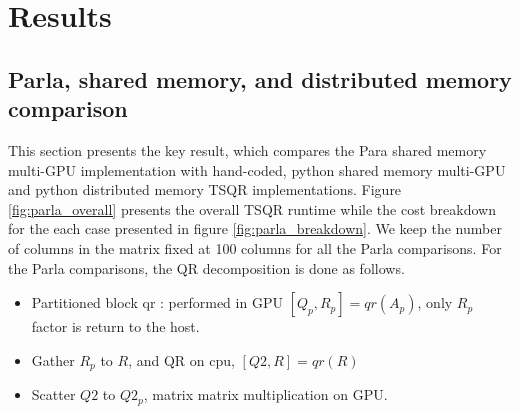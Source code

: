\documentclass{article}
\begin{document}
\section{Results}

\subsection{Parla, shared memory, and distributed memory comparison}
This  section presents the key result, which compares the Para shared memory multi-GPU implementation with hand-coded, python shared memory multi-GPU and python distributed memory TSQR implementations. Figure \ref{fig:parla_overall} presents the overall TSQR runtime while the cost breakdown for the each case presented in figure \ref{fig:parla_breakdown}. We keep the number of columns in the matrix fixed at 100 columns for all the Parla comparisons. For the Parla comparisons, the QR decomposition is done as follows.
\begin{itemize}
    \item Partitioned block qr : performed in GPU $[Q_p,R_p]=qr(A_p)$, only $R_p$ factor is return to the host. 
    \item Gather $R_p$ to $R$, and QR on cpu, $[Q2,R]=qr(R)$
    \item Scatter $Q2$ to $Q2_p$, matrix matrix multiplication on GPU. 
\end{itemize}
\end{document}
